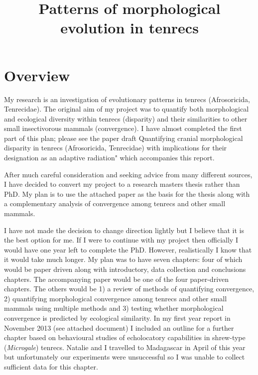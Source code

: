 \documentclass[12pt,a4paper]{article}
\begin{document}
\title{Patterns of morphological evolution in tenrecs}
\author{}
\date{}
\maketitle


\renewcommand{\headrulewidth}{0.0pt}
\thispagestyle{fancy}				%
\chead{}


\section{Overview}

	My research is an investigation of evolutionary patterns in tenrecs (Afrosoricida,  Tenrecidae). The original aim of my project was to quantify both morphological and ecological diversity within tenrecs (disparity) and their similarities to other small insectivorous mammals (convergence). I have almost completed the first part of this plan; please see the paper draft Quantifying cranial morphological disparity in tenrecs (Afrosoricida, Tenrecidae) with implications for their designation as an adaptive radiation" which accompanies this report.

	After much careful consideration and seeking advice from many different sources, I have decided to convert my project to a research masters thesis rather than PhD. My plan is to use the attached paper as the basis for the thesis along with a complementary analysis of convergence among tenrecs and other small mammals. 

	I have not made the decision to change direction lightly but I believe that it is the best option for me. If I were to continue with my project then officially I would have one year left to complete the PhD. However, realistically I know that it would take much longer. My plan was to have seven chapters: four of which would be paper driven along with introductory, data collection and conclusions chapters. The accompanying paper would be one of the four paper-driven chapters. The others would be 1) a review of methods of quantifying convergence, 2) quantifying morphological convergence among tenrecs and other small mammals using multiple methods and 3) testing whether morphological convergence is predicted by ecological similarity. In my first year report in November 2013 (see attached document) I included an outline for a further chapter based on behavioural studies of echolocatory capabilities in shrew-type (\textit{Microgale}) tenrecs. Natalie and I travelled to Madagascar in April of this year but unfortunately our experiments were unsuccessful so I was unable to collect sufficient data for this chapter.
\end{document}

